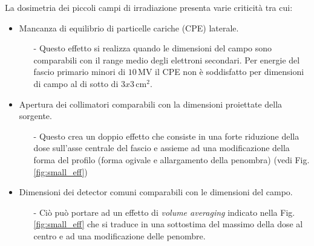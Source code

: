 La dosimetria dei piccoli campi di irradiazione presenta varie criticità \cite{Das2008} tra cui:
\begin{itemize}
\item Mancanza di equilibrio di particelle cariche (CPE) laterale.
\begin{itemize}
\item[-] Questo effetto si realizza quando le dimensioni del campo sono comparabili con il range medio degli elettroni secondari. Per energie del fascio primario minori di $10\,$MV il CPE non è soddisfatto per dimensioni di campo al di sotto di $3x3\,$cm$^2$.
\end{itemize}
\item Apertura dei collimatori comparabili con la dimensioni proiettate della sorgente.
\begin{itemize}
\item[-] Questo crea un doppio effetto che consiste in una forte riduzione della dose sull'asse centrale del fascio e assieme ad una modificazione della forma del profilo (forma ogivale e allargamento della penombra) (vedi Fig.\ref{fig:small_eff})
\end{itemize}
\item Dimensioni dei detector comuni comparabili con le dimensioni del campo.
\begin{itemize}
\item[-] Ciò può portare ad un effetto di \textit{volume averaging} indicato nella Fig.\ref{fig:small_eff} che si traduce in una sottostima del massimo della dose al centro e ad una modificazione delle penombre.
\end{itemize}
\end{itemize}
